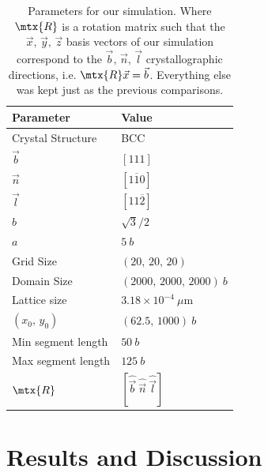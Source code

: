 \documentclass[11pt]{iopart}
\begin{document}
\begin{table}
    \centering
    \caption{Parameters for our simulation. Where $\mtx{R}$ is a rotation matrix such that the $\vec{x},\, \vec{y},\, \vec{z}$ basis vectors of our simulation correspond to the $\vec{b},\, \vec{n},\, \vec{l}$ crystallographic directions, i.e. $\mtx{R} \vec{x} = \vec{b}$. Everything else was kept just as the previous comparisons.}
    \label{t:simulation_params}
    \begin{tabular}{ll}
        \toprule
        Parameter          & Value                                           \\
        \midrule
        Crystal Structure  & BCC                                             \\
        $\vec{b}$          & $[1 1 1]$                                       \\
        $\vec{n}$          & $[1 \overline{1} 0]$                            \\
        $\vec{l}$          & $[1 1 \overline{2}]$                            \\
        $b$                & $\sqrt{3}/2$                                    \\
        $a$                & $5~b$                                           \\
        Grid Size          & $(20,\, 20,\, 20)$                              \\
        Domain Size        & $(2000,\, 2000,\, 2000)~b$                      \\
        Lattice size       & $3.18\times 10^{-4}~\mu\text{m}$                \\
        $(x_{0},\, y_{0})$ & $(62.5,\, 1000)~b$                              \\
        Min segment length & $50~b$                                          \\
        Max segment length & $125~b$                                         \\
        $\mtx{R}$          & $[\hat{\vec{b}}~ \hat{\vec{n}}~ \hat{\vec{l}}]$ \\
        \bottomrule
    \end{tabular}
\end{table}

\section{Results and Discussion}\label{s:results}
\end{document}

